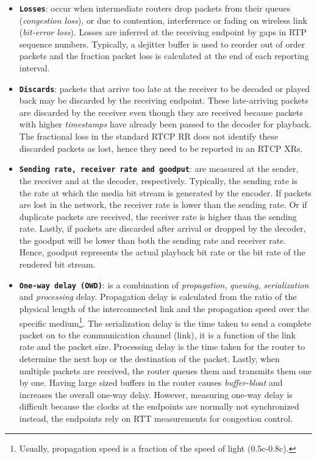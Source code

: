 \begin{itemize}
\setlength{\itemsep}{0pt}

\item \textbf{\texttt{Losses}}: occur when intermediate routers drop packets
from their queues (\emph{congestion loss}), or due to contention, interference
or fading on wireless link (\emph {bit-error loss}). Losses are inferred at
the receiving endpoint by gaps in RTP sequence numbers. Typically, a dejitter
buffer is used to reorder out of order packets and the fraction packet loss is
calculated at the end of each reporting interval.

\item \textbf{\texttt{Discards}}: packets that arrive too late at the receiver
to be decoded or played back may be discarded by the receiving endpoint. These
late-arriving packets are discarded by the receiver even though they are
received because packets with higher \textit{timestamps} have already been
passed to the decoder for playback. The fractional loss in the standard RTCP
RR does not identify these discarded packets as lost, hence they need to be
reported in an RTCP XRs.

\item \textbf{\texttt{Sending rate, receiver rate and goodput}}: are measured
at the sender, the receiver and at the decoder, respectively. Typically, the
sending rate is the rate at which the media bit stream is generated by the
encoder. If packets are lost in the network, the receiver rate is lower than
the sending rate. Or if duplicate packets are received, the receiver rate is
higher than the sending rate. Lastly, if packets are discarded after arrival
or dropped by the decoder, the goodput will be lower than both the sending
rate and receiver rate. Hence, goodput represents the actual playback bit rate
or the bit rate of the rendered bit stream.

\item \textbf{\texttt{One-way delay (OWD)}}: is a combination of
\emph{propagation}, \emph{queuing}, \emph{serialization} and \emph{processing}
delay. Propagation delay is calculated from the ratio of the physical length
of the interconnected link and the propagation speed over the specific
medium\footnote{Usually, propagation speed is a fraction of the speed of light
($0.5$c-$0.8$c).}. The serialization delay is the time taken to send a
complete packet on to the communication channel (link), it is a function of
the link rate and the packet size. Processing delay is the time taken for the
router to determine the next hop or the destination of the packet. Lastly,
when multiple packets are received, the router queues them and transmits them
one by one. Having large sized buffers in the router causes \emph{buffer-bloat}
\cite{gettys:bufferbloat} and increases the overall one-way delay.
However, measuring one-way delay is difficult because the clocks at the
endpoints are normally not synchronized instead, the endpoints rely on RTT
measurements for congestion control.


\end{itemize}
